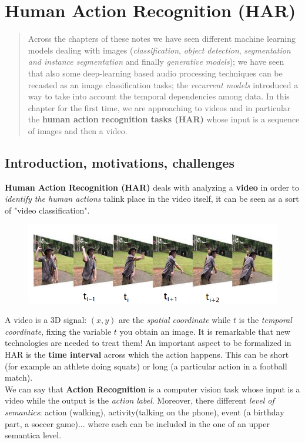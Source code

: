 \chapter{Human Action Recognition (HAR)}

\begin{quotation}
    \noindent
    \textsf{Across the chapters of these notes we have seen different machine learning models dealing with images (\textit{classification}, \textit{object detection}, \textit{segmentation and instance segmentation} and finally \textit{generative models}); we have seen that also some deep-learning based audio processing techniques can be recasted as an image classification tasks; the \textit{recurrent models} introduced a way to take into account the temporal dependencies among data. In this chapter for the first time, we are approaching to videos and in particular the \textbf{human action recognition tasks (HAR)} whose input is a sequence of images and then a video.
    }
\end{quotation}

\noindent
\section{Introduction, motivations, challenges}
\textbf{Human Action Recognition (HAR)} deals with analyzing a \textbf{video} in order to \textit{identify the human actions} talink place in the video itself, it can be seen as a sort of "video classification".

\begin{figure}[h]
    \centering
    \includegraphics[scale=0.6]{img/video.png}
\end{figure}

\noindent
A video is a 3D signal: $(x,y)$ are the \textit{spatial coordinate} while $t$ is the \textit{temporal coordinate}, fixing the variable $t$ you obtain an image. It is remarkable that new technologies are needed to treat them! An important aspect to be formalized in HAR is the \textbf{time interval} across which the action happens. This can be short (for example an athlete doing squats) or long (a particular action in a football match). \\
We can say that \textbf{Action Recognition} is a computer vision task whose input is a video while the output is the \textit{action label}. Moreover, there different \textit{level of semantics}: action (walking), activity(talking on the phone), event (a birthday part, a soccer game)... where each can be included in the one of an upper semantica level.

